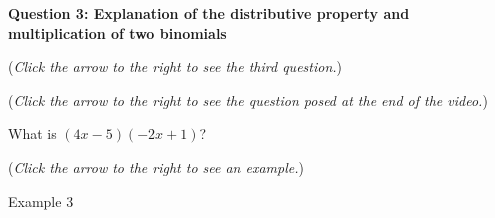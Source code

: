 \documentclass{ximera}
\begin{document}
\textbf{Question 3: Explanation of the distributive property and multiplication of two binomials}
\begin{question}
\begin{flushright}
{\color{blue}(\emph{Click the arrow to the right to see the third question.}) }
\end{flushright}
\begin{center}
\begin{expandable}
{\color{blue}(\emph{Click the arrow to the right to see the question
posed at the end of the video.})}
\begin{expandable}
What is $(4x-5)(-2x+1)$?
\begin{multipleChoice}
\end{multipleChoice}
\begin{flushright}
{\color{blue}(\emph{Click the arrow to the right to see an example.})}
\end{flushright}
\begin{expandable}
Example 3
\end{expandable}
\end{expandable}
\end{expandable}
\end{center}
\end{question}
\end{document}
